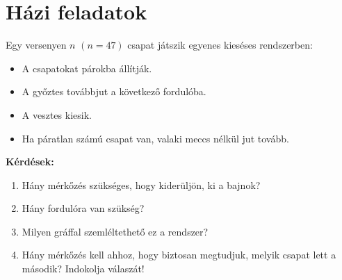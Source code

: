 \section*{Házi feladatok}
\begin{problem}
Egy versenyen $n$ $(n=47)$ csapat játszik egyenes kieséses rendszerben:
\begin{itemize}
\item A csapatokat párokba állítják. 
\item A győztes továbbjut a következő fordulóba. 
\item A vesztes kiesik. 
\item Ha páratlan számú csapat van, valaki meccs nélkül jut tovább. 
\end{itemize}
\vspace{1em}

\textbf{Kérdések:} 
\begin{enumerate}
\item Hány mérkőzés szükséges, hogy kiderüljön, ki a bajnok? 
\item Hány fordulóra van szükség? 
\item Milyen gráffal szemléltethető ez a rendszer? 
\item Hány mérkőzés kell ahhoz, hogy biztosan megtudjuk, melyik csapat lett
a második? Indokolja válaszát! 
\end{enumerate}
\end{problem}

